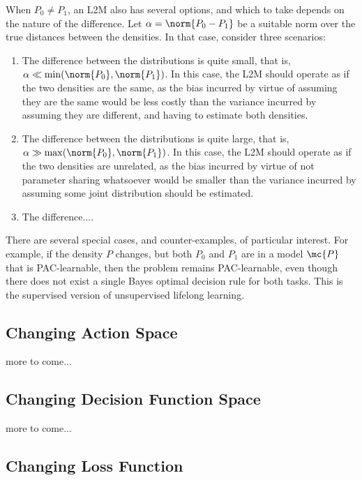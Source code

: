 \documentclass{article}
\begin{document}
When $P_0 \neq P_1$, an L2M also has several options, and which to take depends on the nature of the difference.  Let $\alpha=\norm{ P_0 - P_1}$ be a suitable norm over the true distances between the densities.  In that case, consider three scenarios:
\begin{enumerate}
    \item The difference between the distributions is quite small, that is, $\alpha \ll \min (\norm{P_0},\norm{P_1} )$.  In this case, the L2M should operate as if the two densities are the same, as the bias incurred by virtue of assuming they are the same would be less costly than the variance incurred by assuming they are different, and having to estimate both densities.
    \item The difference between the distributions is quite large, that is, $\alpha \gg \max (\norm{P_0},\norm{P_1} )$. In this case, the L2M should operate as if the two densities are unrelated, as the bias incurred by virtue of not parameter sharing whatsoever would be smaller than the variance incurred by assuming some joint distribution should be estimated.
    \item The difference....
\end{enumerate}


There are several special cases, and counter-examples, of particular interest.  For example, if the density $P$ changes, but both $P_0$ and $P_1$ are in a model $\mc{P}$ that is PAC-learnable, then the problem remains PAC-learnable, even though there does not exist a single Bayes optimal decision rule for both tasks. This is the supervised version of unsupervised lifelong learning.  



\subsection{Changing Action Space}

more to come...

\subsection{Changing Decision Function Space}

more to come...

\subsection{Changing Loss Function}
\end{document}
